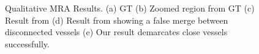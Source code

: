 \begin{figure}[t]
\begin{subfigure}[c]{0.18\textwidth}
		\caption{\label{fig:mri_qual_e}}
	\end{subfigure}
	\hfill\null
	\caption{Qualitative MRA Results. (a) GT (b) Zoomed region from GT (c) Result from \cite{sironi2015} (d) Result from \cite{cciccek20163d} showing a false merge between disconnected vessels (e) Our result demarcates close vessels successfully.}
	\label{fig:mri_qualitative}
\end{figure}

